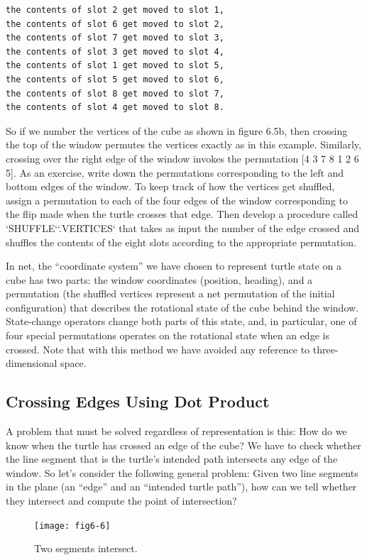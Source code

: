 \documentclass{book}
\begin{document}
\begin{verbatim}
the contents of slot 2 get moved to slot 1,
the contents of slot 6 get moved to slot 2,
the contents of slot 7 get moved to slot 3,
the contents of slot 3 get moved to slot 4,
the contents of slot 1 get moved to slot 5,
the contents of slot 5 get moved to slot 6,
the contents of slot 8 get moved to slot 7,
the contents of slot 4 get moved to slot 8.
\end{verbatim}
So if we number the vertices of the cube as shown in figure 6.5b, then
crossing the top of the window permutes the vertices exactly as in this
example. Similarly, crossing over the right edge of the window invokes
the permutation [4 3 7 8 1 2 6 5]. As an exercise, write down the
permutations corresponding to the left and bottom edges of the window.
To keep track of how the vertices get shuffled, assign a permutation
to each of the four edges of the window corresponding to the flip made
when the turtle crosses that edge. Then develop a procedure called
\textsc{`SHUFFLE`}\textsc{`.VERTICES`} that takes as input the number of the edge crossed
and shuffles the contents of the eight slots according to the appropriate
permutation.

In net, the ``coordinate system'' we have chosen to represent turtle
state on a cube has two parts: the window coordinates (position, heading), and a permutation (the shuffled vertices represent a net permutation of the initial configuration) that describes the rotational state of the
cube behind the window. State-change operators change both parts of
this state, and, in particular, one of four special permutations operates
on the rotational state when an edge is crossed. Note that with this
method we have avoided any reference to three-dimensional space.

\subsection{Crossing Edges Using Dot Product}

A problem that must be solved regardless of representation is this: How
do we know when the turtle has crossed an edge of the cube? We
have to check whether the line segment that is the turtle's intended
path intersects any edge of the window. So let's consider the following
general problem: Given two line segments in the plane (an ``edge'' and
an ``intended turtle path''), how can we tell whether they intersect and
compute the point of intersection?

\begin{figure}
\begin{center}
\texttt{[image: fig6-6]}
\caption{Two segments intersect.}
\end{center}
\end{figure}
\end{document}
